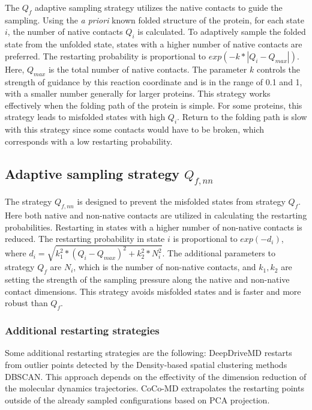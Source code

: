 The  $Q_{f}$ adaptive sampling strategy utilizes the native contacts to guide the sampling. Using the \emph{a priori} known folded structure of the protein, for each state $i$, the number of native contacts $Q_i$ is calculated. To adaptively sample the folded state from the unfolded state, states with a higher number of native contacts are preferred. The restarting probability is proportional to $exp( - k * | Q_i - Q_{max} | )$. Here, $Q_{max}$ is the total number of native contacts. The parameter $k$ controls the strength of guidance by this reaction coordinate and is in the range of 0.1 and 1, with a smaller number generally for larger proteins. This strategy works effectively when the folding path of the protein is simple. For some proteins, this strategy leads to misfolded states with high $Q_i$. Return to the folding path is slow with this strategy since some contacts would have to be broken, which corresponds with a low restarting probability.

\subsection{Adaptive sampling strategy $Q_{f,nn}$}

The strategy $Q_{f, nn}$ is designed to prevent the misfolded states from strategy $Q_{f}$.
Here both native and non-native contacts are utilized in calculating the restarting probabilities. Restarting in states with a higher number of non-native contacts is reduced.
The restarting probability in state $i$ is proportional to $exp(-d_i)$, where $d_i = \sqrt{k_1^2 * (Q_i - Q_{max})^2  + k_2^2 * N_i^2}$. 
The additional parameters to strategy $Q_{f}$ are $N_i$, which is the number of
non-native contacts, and $k_1, k_2$ are setting the strength of the sampling pressure along the native and non-native contact dimensions. This strategy avoids misfolded states and is faster and more robust than $Q_{f}$.

\subsubsection{Additional restarting strategies}
Some additional restarting strategies are the following:
DeepDriveMD\cite{leeDeepDriveMDDeepLearningDriven2019} restarts from outlier points detected by the Density-based spatial clustering methods DBSCAN. This approach depends on the effectivity of the dimension reduction of the molecular dynamics trajectories. CoCo-MD extrapolates the restarting points outside of the already sampled configurations based on PCA projection\cite{shkurti2019jctc,harada2015jctc,harada2017jctc}.  


